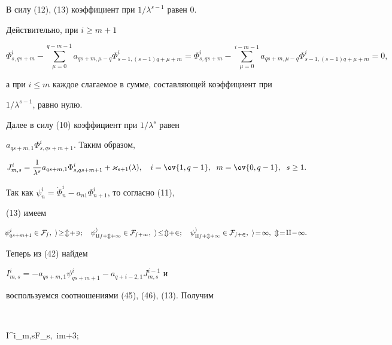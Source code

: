 В силу (12), (13) коэффициент при $1/\lambda^{s-1}$ равен 0. 


Действительно, при $i\ge m+1$ 


$$


\Phi^i_{s,qs+m}-\sum^{q-m-1}_{\mu=0} 


a_{qs+m,\mu-q}\Phi^i_{s-1,(s-1)q+\mu+m}= 


\Phi^i_{s,qs+m}-\sum^{i-m-1}_{\mu=0} 


a_{qs+m,\mu-q}\Phi^i_{s-1,(s-1)q+\mu+m}=0, 


$$


а при $i\le m$ каждое слагаемое в сумме, составляющей коэффициент при 


$1/\lambda^{s-1}$, равно нулю. 


 


Далее в силу (10) коэффициент при $1/\lambda^s$ равен 


$a_{qs+m,1}\Phi^i_{s,qs+m+1}$. Таким образом, 


\begin{equation} 


J^i_{m,s}=\frac{1}{\lambda^s}a_{qs+m,1}\Phi^i_{s,qs+m+1}+ 


\varkappa_{s+1}(\lambda),\quad i=\ov{1,q-1},\ \;m=\ov{0,q-1}, 


\ \;s\ge 1. 


\end{equation} 


Так как $\psi^i_n=\Dot\Phi^i_n-a_{n1}\Phi^i_{n+1}$, то согласно (11), 


(13) имеем 


\begin{equation} 


\negthickspace


\psi^i_{qs+m+1}\in\cal F_s,\ i\!\ge\! m\!+\!3;\quad 


\psi^i_{qs+m+1}\in\cal F_{s+1},\ i\!\le\! m\!+\!2;\quad 


\psi^i_{qs+m+1}\in\cal F_{s+2},\ i\!=\!1,\ m\!=\!q\!-\!1. 


\end{equation} 


Теперь из (42) найдем 


$I^i_{m,s}=-a_{qs+m,1}\psi^i_{qs+m+1}-a_{q+i-2,1}J^{i-1}_{m,s}$ и 


воспользуемся соотношениями (45), (46), (13). Получим 


$$ 


I^i_{m,s}\in\cal F_s,\ \;i\ge m+3;\quad 


